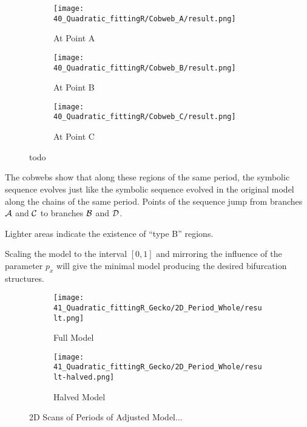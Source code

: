\begin{figure}
	\centering
	\begin{subfigure}{0.3\textwidth}
		\centering
		\texttt{[image: 40\_Quadratic\_fittingR/Cobweb\_A/result.png]}
		\caption{At Point A}
		\label{fig:setup.quad.hyper.cobweb.A}
	\end{subfigure}
	\begin{subfigure}{0.3\textwidth}
		\centering
		\texttt{[image: 40\_Quadratic\_fittingR/Cobweb\_B/result.png]}
		\caption{At Point B}
		\label{fig:setup.quad.hyper.cobweb.B}
	\end{subfigure}
	\begin{subfigure}{0.3\textwidth}
		\centering
		\texttt{[image: 40\_Quadratic\_fittingR/Cobweb\_C/result.png]}
		\caption{At Point C}
		\label{fig:setup.quad.hyper.cobweb.C}
	\end{subfigure}
	\caption[todo]{
		todo
	}
	\label{fig:setup.quad.hyper.cobwebs}
\end{figure}

The cobwebs show that along these regions of the same period, the symbolic sequence evolves just like the symbolic sequence evolved in the original model along the chains of the same period.
Points of the sequence jump from branches $\mathcal{A}$ and $\mathcal{C}$ to branches $\mathcal{B}$ and $\mathcal{D}$.

Lighter areas indicate the existence of ``type B'' regions.


Scaling the model to the interval $[0, 1]$ and mirroring the influence of the parameter $p_x$ will give the minimal model producing the desired bifurcation structures.



\begin{figure}
	\centering
	\begin{subfigure}{0.4\textwidth}
		\centering
		\texttt{[image: 41\_Quadratic\_fittingR\_Gecko/2D\_Period\_Whole/result.png]}
		\caption{Full Model}
		\label{fig:quadratic.full.fit.2.period.full}
	\end{subfigure}
	\begin{subfigure}{0.4\textwidth}
		\centering
		\texttt{[image: 41\_Quadratic\_fittingR\_Gecko/2D\_Period\_Whole/result-halved.png]}
		\caption{Halved Model}
		\label{fig:quadratic.full.fit.2.period.halved}
	\end{subfigure}
	\caption{2D Scans of Periods of Adjusted Model...}
\end{figure}

